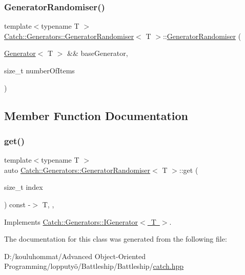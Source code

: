 \subsubsection{\texorpdfstring{Generator\+Randomiser()}{GeneratorRandomiser()}}
{\footnotesize\ttfamily template$<$typename T $>$ \\
\mbox{\hyperlink{class_catch_1_1_generators_1_1_generator_randomiser}{Catch\+::\+Generators\+::\+Generator\+Randomiser}}$<$ T $>$\+::\mbox{\hyperlink{class_catch_1_1_generators_1_1_generator_randomiser}{Generator\+Randomiser}} (\begin{DoxyParamCaption}\item[{\mbox{\hyperlink{class_catch_1_1_generators_1_1_generator}{Generator}}$<$ T $>$ \&\&}]{base\+Generator,  }\item[{size\+\_\+t}]{number\+Of\+Items }\end{DoxyParamCaption})\hspace{0.3cm}{\ttfamily [inline]}}



\subsection{Member Function Documentation}
\mbox{\label{class_catch_1_1_generators_1_1_generator_randomiser_a4ad5de15865727bdaa638863e0969ab4}} 
\subsubsection{\texorpdfstring{get()}{get()}}
{\footnotesize\ttfamily template$<$typename T $>$ \\
auto \mbox{\hyperlink{class_catch_1_1_generators_1_1_generator_randomiser}{Catch\+::\+Generators\+::\+Generator\+Randomiser}}$<$ T $>$\+::get (\begin{DoxyParamCaption}\item[{size\+\_\+t}]{index }\end{DoxyParamCaption}) const -\/$>$ T\hspace{0.3cm}{\ttfamily [inline]}, {\ttfamily [override]}, {\ttfamily [virtual]}}



Implements \mbox{\hyperlink{struct_catch_1_1_generators_1_1_i_generator_a737a89eb0bff02e580e36c59fb0d1171}{Catch\+::\+Generators\+::\+I\+Generator$<$ T $>$}}.



The documentation for this class was generated from the following file\+:\begin{DoxyCompactItemize}
\item 
D\+:/kouluhommat/\+Advanced Object-\/\+Oriented Programming/lopputyö/\+Battleship/\+Battleship/\mbox{\hyperlink{catch_8hpp}{catch.\+hpp}}\end{DoxyCompactItemize}
